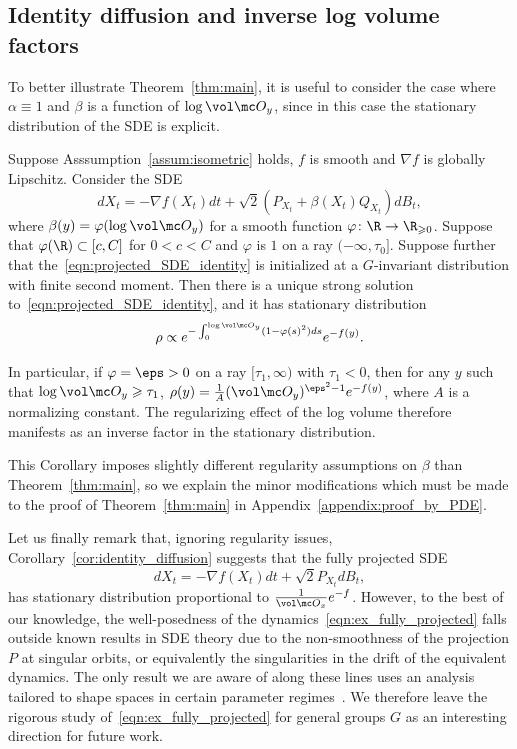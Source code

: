 \documentclass[twoside,a4paper,11pt]{article}
\renewcommand{\phi}{\varphi}
\theoremstyle{plain}
\begin{document}
\subsection{Identity diffusion and inverse log volume
factors}
\label{subsec:applications}

To better illustrate Theorem~\ref{thm:main},
it is useful to consider the case where $\alpha \equiv 1$
and
$\beta$ is a function of $\log \vol\mc O_y$, since in this
case the stationary
distribution of the SDE is explicit.
\begin{corollary}\label{cor:identity_diffusion}
Suppose Asssumption~\ref{assum:isometric} holds,
$f$ is smooth and $\nabla f$ is globally Lipschitz.
Consider the SDE
\begin{equation}\label{eqn:projected_SDE_identity}
dX_t = -\nabla f(X_t)dt + \sqrt{2}(P_{X_t} + \beta(X_t)Q_{X_t})dB_t,
\end{equation} where $\beta(y) = \phi(\log \vol \mc O_y)$
for a smooth function
$\phi \colon \R \to \R_{\geqslant 0}$.
Suppose that $\phi(\R) \subset [c, C]$
for $0 < c < C$ and
$\phi$ is $1$ on 
a ray $(-\infty, \tau_0]$.
Suppose further that the~\eqref{eqn:projected_SDE_identity}
is initialized at a $G$-invariant distribution
with finite second moment.
Then there is a unique strong solution to~\eqref{eqn:projected_SDE_identity},
and it has stationary distribution
$$
\rho \propto e^{-\int_{0}^{\log \vol \mc O_y} (1- \phi(s)^2) d s} e^{-f(y)}.
$$
\end{corollary}
In particular, if $\phi =\eps > 0$
on a ray $[\tau_1, \infty)$ with $\tau_1 < 0$, then for any $y$ such that
$\log \vol \mc O_y \geqslant \tau_1$,
$\rho(y) = \frac{1}{A}(\vol \mc O_y)^{\eps^2-1}e^{-f(y)}$,
where $A$ is a normalizing constant. The regularizing effect of the log volume
therefore manifests as an inverse factor
in the stationary distribution.

This Corollary imposes slightly different
regularity assumptions on $\beta$ than Theorem~\ref{thm:main},
so we explain the minor modifications
which must be made to
the proof of Theorem~\ref{thm:main}
in Appendix~\ref{appendix:proof_by_PDE}.

Let us finally remark that, ignoring regularity issues, Corollary~\ref{cor:identity_diffusion}
suggests that the fully projected SDE
\begin{equation}\label{eqn:ex_fully_projected}
dX_t = -\nabla f(X_t) dt + \sqrt{2}P_{X_t}dB_t,
\end{equation} has stationary distribution proportional
to $\frac{1}{\vol \mc O_x}e^{-f}$.
However,
to the best of our knowledge,
the well-posedness
of the dynamics~\eqref{eqn:ex_fully_projected}
falls outside known
results in SDE theory due to the
non-smoothness of the projection
$P$ at singular orbits, or equivalently
the singularities in the drift
of the equivalent dynamics.
The only result we are aware of 
along these lines uses an analysis
tailored to shape spaces in certain parameter regimes~\cite{le1994brownian}.
We therefore leave the rigorous study of~\eqref{eqn:ex_fully_projected}
for general groups $G$
as an interesting direction for future work.
\end{document}
